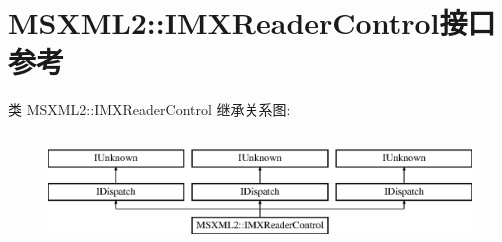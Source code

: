 \hypertarget{interface_m_s_x_m_l2_1_1_i_m_x_reader_control}{}\section{M\+S\+X\+M\+L2\+:\+:I\+M\+X\+Reader\+Control接口 参考}
\label{interface_m_s_x_m_l2_1_1_i_m_x_reader_control}
类 M\+S\+X\+M\+L2\+:\+:I\+M\+X\+Reader\+Control 继承关系图\+:\begin{figure}[H]
\begin{center}
\leavevmode
\includegraphics[height=3.000000cm]{interface_m_s_x_m_l2_1_1_i_m_x_reader_control}
\end{center}
\end{figure}
